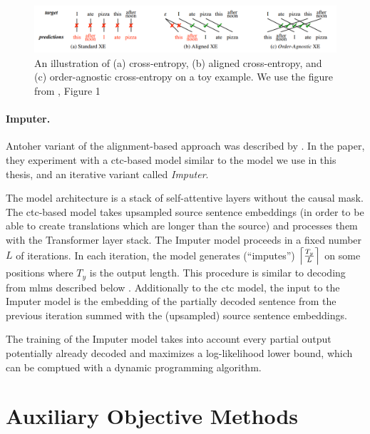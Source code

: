 \begin{figure}
  \centering
  \includegraphics[width=\textwidth]{img/oaxe.png}

  \caption{An illustration of (a) cross-entropy, (b) aligned cross-entropy, and
    (c) order-agnostic cross-entropy on a toy example. We use the figure from
    \citet{du2021orderagnostic}, Figure 1}%
  \label{fig:oaxe-example}
\end{figure}


\paragraph{Imputer.} Antoher variant of the alignment-based approach was
described by \citet{saharia-etal-2020-non}. In the paper, they experiment with
a \acs{ctc}-based model similar to the model we use in this thesis, and an
iterative variant called \emph{Imputer}.

The model architecture is a stack of self-attentive layers without the causal
mask. The \acs{ctc}-based model takes upsampled source sentence embeddings (in
order to be able to create translations which are longer than the source) and
processes them with the Transformer layer stack.  The Imputer model proceeds in
a fixed number $L$ of iterations. In each iteration, the model generates
(``imputes'') $\ceil*{\frac{T_y}{L}}$ on some positions where $T_y$ is the
output length. This procedure is similar to decoding from \aclp{mlm} described
below . Additionally to the \ac{ctc} model, the input to the
Imputer model is the embedding of the partially decoded sentence from the
previous iteration summed with the (upsampled) source sentence embeddings.

The training of the Imputer model takes into account every partial output
potentially already decoded and maximizes a log-likelihood lower bound, which
can be comptued with a dynamic programming algorithm. 



\section{Auxiliary Objective Methods}
\label{sec:nat:aux}



